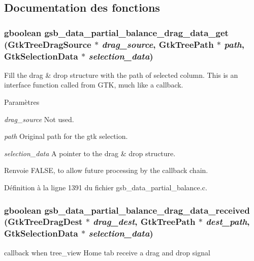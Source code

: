 \subsection{Documentation des fonctions}
\subsubsection[{gsb\_\-data\_\-partial\_\-balance\_\-drag\_\-data\_\-get}]{\setlength{\rightskip}{0pt plus 5cm}gboolean gsb\_\-data\_\-partial\_\-balance\_\-drag\_\-data\_\-get (GtkTreeDragSource $\ast$ {\em drag\_\-source}, \/  GtkTreePath $\ast$ {\em path}, \/  GtkSelectionData $\ast$ {\em selection\_\-data})}\label{gsb__data__partial__balance_8h_ae6b9a481d5b88820519dff2b7904824c}
Fill the drag \& drop structure with the path of selected column. This is an interface function called from GTK, much like a callback.


\begin{DoxyParams}{Paramètres}
\item[{\em drag\_\-source}]Not used. \item[{\em path}]Original path for the gtk selection. \item[{\em selection\_\-data}]A pointer to the drag \& drop structure.\end{DoxyParams}
\begin{DoxyReturn}{Renvoie}
FALSE, to allow future processing by the callback chain. 
\end{DoxyReturn}


Définition à la ligne 1391 du fichier gsb\_\-data\_\-partial\_\-balance.c.

\subsubsection[{gsb\_\-data\_\-partial\_\-balance\_\-drag\_\-data\_\-received}]{\setlength{\rightskip}{0pt plus 5cm}gboolean gsb\_\-data\_\-partial\_\-balance\_\-drag\_\-data\_\-received (GtkTreeDragDest $\ast$ {\em drag\_\-dest}, \/  GtkTreePath $\ast$ {\em dest\_\-path}, \/  GtkSelectionData $\ast$ {\em selection\_\-data})}\label{gsb__data__partial__balance_8h_a644c11f20828df365b13b5e5312f65a2}
callback when tree\_\-view Home tab receive a drag and drop signal


